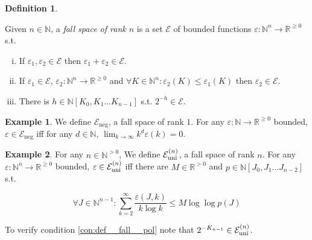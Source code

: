 \documentclass{article}
\numberwithin{equation}{section}
\theoremstyle{definition}
\newtheorem{definition}{Definition}[section]
\newtheorem{example}{Example}[section]
\theoremstyle{plain}
\newcommand{\Nats}{\mathbb{N}}
\newcommand{\Reals}{\mathbb{R}}
\newcommand{\NatPoly}{\Nats[K_0, K_1 \ldots K_{n-1}]}
\newcommand{\NatPolyJ}{\Nats[J_0, J_1 \ldots J_{n-2}]}
\newcommand{\NatFun}{\Nats^n \rightarrow}
\newcommand{\Lim}[1]{\lim_{#1 \rightarrow \infty}}
\newcommand{\Fall}{\mathcal{E}}
\newcommand{\FallU}{{\Fall_{\textnormal{uni}}^{(n)}}}
\begin{document}
\begin{definition}
\label{def:fall}

Given $n \in \Nats$, a \emph{fall space of rank $n$} is a set $\Fall$ of bounded functions $\varepsilon: \NatFun \Reals^{\geq 0}$ s.t.

\begin{enumerate}[(i)]

\item\label{con:def__fall__add} If $\varepsilon_1, \varepsilon_2 \in \Fall$ then $\varepsilon_1 + \varepsilon_2 \in \Fall$.

\item\label{con:def__fall__ineq} If $\varepsilon_1 \in \Fall$, $\varepsilon_2: \NatFun \Reals^{\geq 0}$ and $\forall K \in \Nats^n: \varepsilon_2(K) \leq \varepsilon_1(K)$ then $\varepsilon_2 \in \Fall$.

\item\label{con:def__fall__pol} There is $h \in \NatPoly$ s.t. $2^{-h} \in \Fall$.

\end{enumerate}
\end{definition}

\begin{example}

We define $\Fall_{\text{neg}}$, a fall space of rank $1$. For any $\varepsilon: \Nats \rightarrow \Reals^{\geq 0}$ bounded, $\varepsilon \in \Fall_{\text{neg}}$ iff for any $d \in \Nats$, $\Lim{k} k^d \varepsilon(k) = 0$.

\end{example}

\begin{samepage}
\begin{example}
\label{exm:e_uni}
For any ${n \in \Nats^{>0}}$, We define ${\FallU}$, a fall space of rank ${n}$. For any ${\varepsilon: \NatFun \Reals^{\geq 0}}$ bounded, $\varepsilon \in \FallU$ iff there are ${M \in \Reals^{>0}}$ and ${p \in \NatPolyJ}$ s.t.

\begin{equation}
\forall J \in \Nats^{n-1}: \sum_{k=2}^\infty\frac{\varepsilon(J,k)}{k \log k} \leq M \log \log p(J)
\end{equation}

To verify condition \ref{con:def__fall__pol} note that ${2^{-K_{n-1}} \in \FallU}$.

\end{example}
\end{samepage}
\end{document}
